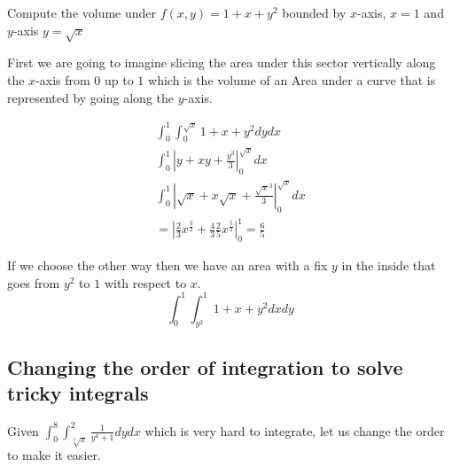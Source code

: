 Compute the volume under \(f(x,y) = 1 + x + y^2\) bounded by \(x\)-axis, \(x = 1\) and \(y\)-axis \(y = \sqrt{x}\)

\begin{center}
\end{center}

First we are going to imagine slicing the area under this sector vertically along the \(x\)-axis from \(0\) up to \(1\) which
is the volume of an Area under a curve that is represented by going along the \(y\)-axis.

\begin{align*}
    \int_{0}^{1}\int_{0}^{\sqrt{x}} 1 + x + y^2 dy dx \\
    \int_{0}^{1} \left| y + xy + \frac{y^3}{3} \right|_{0}^{\sqrt{x}} dx \\
    \int_{0}^{1} \left| \sqrt{x} + x\sqrt{x} + \frac{\sqrt{x}^3}{3} \right|_{0}^{\sqrt{x}} dx \\
    = \left| \frac{2}{3} x^{\frac{3}{2}} + \frac{4}{3} \frac{2}{5} x^{\frac{5}{2}} \right|_{0}^{1} = \frac{6}{5}
\end{align*}

If we choose the other way then we have an area with a fix \(y\) in the inside that goes from \(y^2\) to \(1\) with respect to \(x\).
\[
\int_{0}^{1}\int_{y^2}^{1} 1 + x + y^2 dx dy
\]

\subsection{Changing the order of integration to solve tricky integrals}

Given \(\int_{0}^{8}\int_{\sqrt[3]{x}}^{2} \frac{1}{y^4 +1}dy dx\) which is very hard to integrate, let us change the order
to make it easier.

